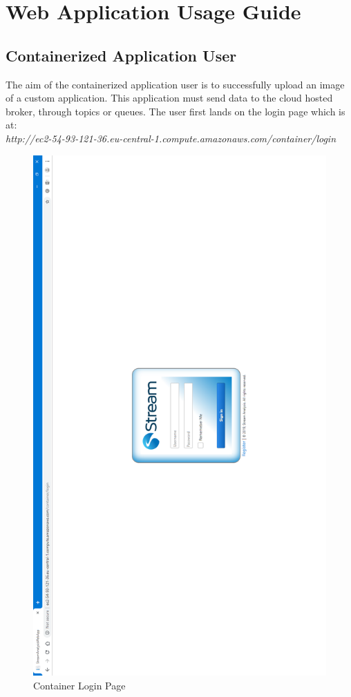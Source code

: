 \chapter{Web Application Usage Guide}
\label{chap:05}

\section{Containerized Application User}
\label{chap:05:01}

The aim of the containerized application user is to successfully upload an image of a custom application. This application must send data to the cloud hosted broker, through topics or queues. The user first lands on the login page which is at:\\

\textit{http://ec2-54-93-121-36.eu-central-1.compute.amazonaws.com/container/login}

\begin{figure}[p]
	\centering
	\noindent
	\includegraphics[width=0.5\paperwidth]{./images/guide/container/login.PNG}
	\caption{Container Login Page}
	\label{fig:containerLogin}
\end{figure}

